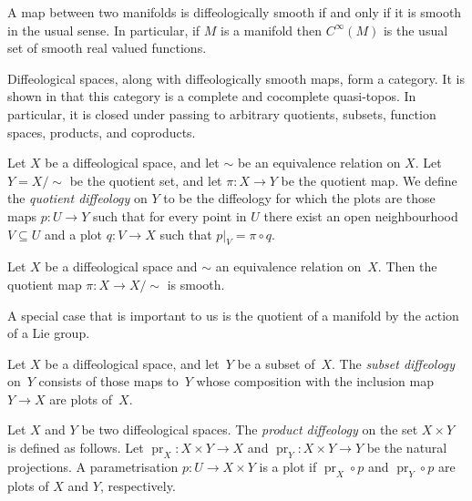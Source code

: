 \documentclass[11pt]{article}
\numberwithin{equation}{section}
\newcommand{\CIN}{{C^\infty}} %
\begin{document}
\begin{Remark}
A map between two manifolds is dif\/feologically smooth
if and only if it is smooth in the usual sense.
In particular, if $M$ is a manifold then $\CIN(M)$ is the usual set
of smooth real valued functions.
\end{Remark}

\begin{Remark}
Dif\/feological spaces, along with dif\/feologically smooth maps,
form a category. It is shown in \cite[Theorem~3.2]{BH} that this category
is a complete and cocomplete quasi-topos.
In particular, it is closed under passing to arbitrary quotients,
subsets, function spaces, products, and coproducts.
\end{Remark}

\begin{Definition}
Let $X$ be a dif\/feological space,
and let $\sim$ be an equivalence relation on $X$.
Let $Y = X/\!\!\sim$ be the quotient set,
and let $\pi \colon X\to Y$ be the quotient map.
We def\/ine the \emph{quotient diffeology} on $Y$
to be the dif\/feology for which the plots are those maps $p \colon U\to Y$
such that for every point in $U$
there exist an open neighbourhood $V \subseteq U$
and a plot $q \colon V\to X$ such that $p|_V = \pi \circ q$.
\end{Definition}

\begin{Remark}
Let $X$ be a dif\/feological space and $\sim$ an equivalence relation on~$X$.
Then the quotient map $\pi \colon X \to X / \!\!\sim$ is smooth.
\end{Remark}

A special case that is important to us is the quotient
of a manifold by the action of a Lie group.

\begin{Definition}
Let $X$ be a dif\/feological space, and let~$Y$ be a subset
of~$X$. The \emph{subset diffeology} on~$Y$ consists
of those maps to~$Y$ whose composition with the inclusion map $Y \to X$
are plots of~$X$.
\end{Definition}

\begin{Definition}
Let $X$ and $Y$ be two dif\/feological spaces.
The \emph{product diffeology} on the set $X \times Y$ is def\/ined as follows.
Let $\operatorname{pr}_X \colon X \times Y \to X$
and $\operatorname{pr}_Y \colon X \times Y \to Y$ be the natural projections.
A parametrisation $p \colon U \to X \times Y$ is a plot
if $\operatorname{pr}_X \circ p$ and $\operatorname{pr}_Y \circ p$
are plots of $X$ and $Y$, respectively.
\end{Definition}
\end{document}
